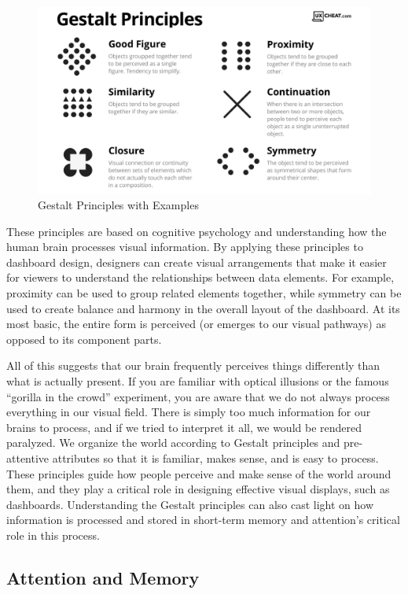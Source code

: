 \documentclass[print]{nuthesis}
\begin{document}
\begin{figure}

{\centering \includegraphics[width=0.75\linewidth]{figure/gestalt_principles} 

}

\caption{Gestalt Principles with Examples}\label{fig:gestalt}
\end{figure}

These principles are based on cognitive psychology and understanding how the human brain processes visual information.
By applying these principles to dashboard design, designers can create visual arrangements that make it easier for viewers to understand the relationships between data elements.
For example, proximity can be used to group related elements together, while symmetry can be used to create balance and harmony in the overall layout of the dashboard.
At its most basic, the entire form is perceived (or emerges to our visual pathways) as opposed to its component parts.

All of this suggests that our brain frequently perceives things differently than what is actually present.
If you are familiar with optical illusions or the famous ``gorilla in the crowd'' experiment, you are aware that we do not always process everything in our visual field.
There is simply too much information for our brains to process, and if we tried to interpret it all, we would be rendered paralyzed.
We organize the world according to Gestalt principles and pre-attentive attributes so that it is familiar, makes sense, and is easy to process.
These principles guide how people perceive and make sense of the world around them, and they play a critical role in designing effective visual displays, such as dashboards.
Understanding the Gestalt principles can also cast light on how information is processed and stored in short-term memory and attention's critical role in this process.

\hypertarget{attention-and-memory}{%
\subsection{Attention and Memory}\label{attention-and-memory}}
\end{document}
